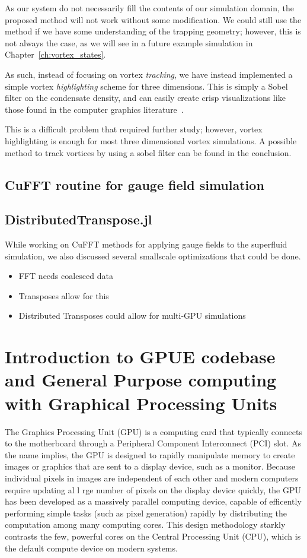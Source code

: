 As our system do not necessarily fill the contents of our simulation domain, the proposed method will not work without some modification.
We could still use the method if we have some understanding of the trapping geometry; however, this is not always the case, as we will see in a future example simulation in Chapter~\ref{ch:vortex_states}.

As such, instead of focusing on vortex \textit{tracking}, we have instead implemented a simple vortex \textit{highlighting} scheme for three dimensions.
This is simply a Sobel filter on the condensate density, and can easily create crisp visualizations like those found in the computer graphics literature~\cite{guo2018}.


This is a difficult problem that required further study; however, vortex highlighting is enough for most three dimensional vortex simulations.
A possible method to track vortices by using a sobel filter can be found in the conclusion.

\section{CuFFT routine for gauge field simulation}

\section{DistributedTranspose.jl}
While working on CuFFT methods for applying gauge fields to the superfluid simulation, we also discussed several smallscale optimizations that could be done.

\begin{itemize}
\item{FFT needs coalesced data}
\item{Transposes allow for this}
\item{Distributed Transposes could allow for multi-GPU simulations}
\end{itemize}
\chapter{Introduction to GPUE codebase and General Purpose computing with Graphical Processing Units}
\label{ch:gpu}

The Graphics Processing Unit (GPU) is a computing card that typically connects to the motherboard through a Peripheral Component Interconnect (PCI) slot.
As the name implies,
the GPU is designed to rapidly manipulate memory to create images or graphics that are sent to a display device, such as a monitor.
Because individual pixels in images are independent of each other and modern computers require updating al l rge number of pixels on the display device quickly, the GPU has been developed as a massively parallel computing device, capable of efficently performing simple tasks (such as pixel generation) rapidly by distributing the computation among many computing cores.
This design methodology starkly contrasts the few, powerful cores on the Central Processing Unit (CPU), which is the default compute device on modern systems.

